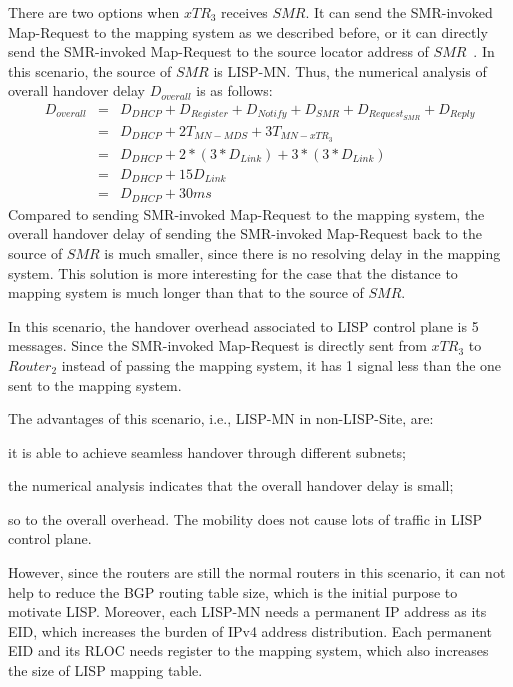 There are two options when $xTR_3$ receives $SMR$. It can send the SMR-invoked Map-Request to the mapping system as we described before, or it can directly send the SMR-invoked Map-Request to the source locator address of $SMR$~\cite{rfc6830}. In this scenario, the source of $SMR$ is LISP-MN. Thus, the numerical analysis of overall handover delay $D_{overall}$ is as follows:
\begin{eqnarray}
D_{overall} &=& D_{DHCP} + D_{Register} + D_{Notify} + D_{SMR} + D_{Request_{SMR}} + D_{Reply} \nonumber \\
&=& D_{DHCP} + 2T_{MN-MDS} + 3T_{MN-xTR_3}  \nonumber \\
&=& D_{DHCP} + 2* (3*D_{Link}) + 3*(3*D_{Link}) \nonumber \\
&=& D_{DHCP} + 15D_{Link}  \\
&=& D_{DHCP} + 30 ms \nonumber
\end{eqnarray}
Compared to sending SMR-invoked Map-Request to the mapping system, the overall handover delay of sending the SMR-invoked Map-Request back to the source of $SMR$ is much smaller, since there is no resolving delay in the mapping system. This solution is more interesting for the case that the distance to mapping system is much longer than that to the source of $SMR$.

In this scenario, the handover overhead associated to LISP control plane is 5 messages. Since the SMR-invoked Map-Request is directly sent from $xTR_3$ to $Router_2$ instead of passing the mapping system, it has 1 signal less than the one sent to the mapping system.

The advantages of this scenario, i.e., LISP-MN in non-LISP-Site, are: 
\begin{inparaenum}[1)]
	\item it is able to achieve seamless handover through different subnets;
	\item the numerical analysis indicates that the overall handover delay is small;
	\item so to the overall overhead. The mobility does not cause lots of traffic in LISP control plane.
\end{inparaenum}
However, since the routers are still the normal routers in this scenario, it can not help to reduce the BGP routing table size, which is the initial purpose to motivate LISP. Moreover, each LISP-MN needs a permanent IP address as its EID, which increases the burden of IPv4 address distribution. Each permanent EID and its RLOC needs register to the mapping system, which also increases the size of LISP mapping table.

